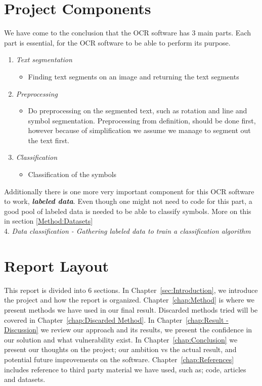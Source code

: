 \documentclass[Report.tex]{subfiles}
\begin{document}
\section{Project Components}
We have come to the conclusion that the OCR software has 3 main parts. Each
part is essential, for the OCR software to be able to perform its purpose.
\begin{enumerate}
 \item{\textit{Text segmentation}}
 \begin{itemize}
  \item{Finding text segments on an image and returning the text segments}
 \end{itemize}
 \item{\textit{Preprocessing}}
 \begin{itemize}
  \item{Do preprocessing on the segmented text, such as rotation and line and
  symbol segmentation. Preprocessing from definition, should be done first,
  however because of simplification we assume we manage to segment out the text
  first.}
 \end{itemize}
 \item{\textit{Classification}}
 \begin{itemize}
  \item{Classification of the symbols}
 \end{itemize}
\end{enumerate}

\begin{flushleft}
  Additionally there is one more very important component for this
  OCR software to work, \textit{\textbf{labeled data}}. Even though one might not
  need to code for this part, a good pool of labeled data is needed to be able to
  classify symbols. More on this in section \ref{Method:Datasets} \\
  4. \textit{Data classification - Gathering labeled data to train a classification algorithm}
\end{flushleft}

\section{Report Layout}
\label{subsec:Report Layout}
This report is divided into 6 sections. In
Chapter~\ref{sec:Introduction}, we introduce the project and how the report
is organized. Chapter~\ref{chap:Method} is where we present methods we have
used in our final result. Discarded methods tried will be covered in Chapter~\ref{chap:Discarded Method}.
In Chapter~\ref{chap:Result - Discussion} we review our approach and
its results, we present the confidence in our solution and what vulnerability
exist. In Chapter~\ref{chap:Conclusion} we present our thoughts on the project;
our ambition vs the actual result, and potential future improvements on the software.
Chapter~\ref{chap:References} includes reference to third party
material we have used, such as; code, articles and datasets.
\end{document}

